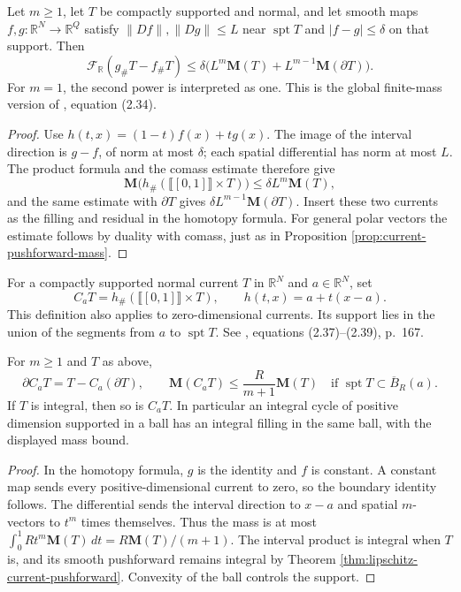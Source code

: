 \begin{proposition}\label{prop:current-homotopy-estimate}
Let $m\geq1$, let $T$ be compactly supported and normal, and let smooth maps $f,g:\mathbb R^N\to\mathbb R^Q$ satisfy $\|Df\|,\|Dg\|\leq L$ near $\operatorname{spt}T$ and $|f-g|\leq\delta$ on that support. Then
\[
 \mathcal F_{\mathbb R}(g_\#T-f_\#T)
 \leq\delta\bigl(L^m\mathbf M(T)+L^{m-1}\mathbf M(\partial T)\bigr).
\]
For $m=1$, the second power is interpreted as one. This is the global finite-mass version of \cite{Sim18}, equation (2.34).
\end{proposition}
\begin{proof}
Use $h(t,x)=(1-t)f(x)+tg(x)$. The image of the interval direction is $g-f$, of norm at most $\delta$; each spatial differential has norm at most $L$. The product formula and the comass estimate therefore give
\[
 \mathbf M\bigl(h_\#(\llbracket[0,1]\rrbracket\times T)\bigr)
 \leq\delta L^m\mathbf M(T),
\]
and the same estimate with $\partial T$ gives $\delta L^{m-1}\mathbf M(\partial T)$. Insert these two currents as the filling and residual in the homotopy formula. For general polar vectors the estimate follows by duality with comass, just as in Proposition \ref{prop:current-pushforward-mass}.
\end{proof}

\begin{definition}\label{def:current-cone}
For a compactly supported normal current $T$ in $\mathbb R^N$ and $a\in\mathbb R^N$, set
\[
 C_aT=h_\#(\llbracket[0,1]\rrbracket\times T),
 \qquad h(t,x)=a+t(x-a).
\]
This definition also applies to zero-dimensional currents. Its support lies in the union of the segments from $a$ to $\operatorname{spt}T$. See \cite{Sim18}, equations (2.37)--(2.39), p.~167.
\end{definition}

\begin{proposition}\label{prop:current-cone-bound}
For $m\geq1$ and $T$ as above,
\[
 \partial C_aT=T-C_a(\partial T),\qquad
 \mathbf M(C_aT)\leq\frac{R}{m+1}\mathbf M(T)
 \quad\text{if }\operatorname{spt}T\subset\overline B_R(a).
\]
If $T$ is integral, then so is $C_aT$. In particular an integral cycle of positive dimension supported in a ball has an integral filling in the same ball, with the displayed mass bound.
\end{proposition}
\begin{proof}
In the homotopy formula, $g$ is the identity and $f$ is constant. A constant map sends every positive-dimensional current to zero, so the boundary identity follows. The differential sends the interval direction to $x-a$ and spatial $m$-vectors to $t^m$ times themselves. Thus the mass is at most
$\int_0^1 Rt^m\mathbf M(T)\,dt=R\mathbf M(T)/(m+1)$.
The interval product is integral when $T$ is, and its smooth pushforward remains integral by Theorem \ref{thm:lipschitz-current-pushforward}. Convexity of the ball controls the support.
\end{proof}

